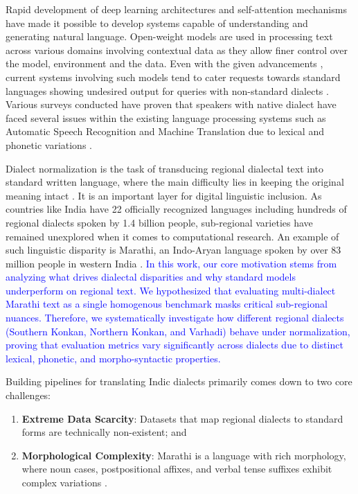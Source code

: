 Rapid development of deep learning architectures and self-attention mechanisms \cite{vaswani2017attention} have made it possible to develop systems capable of understanding and generating natural language. 
Open-weight models are used in processing text across various domains involving contextual data as they allow finer control over the model, environment and the data\cite{dubey2024llama3,gemma2024}.
Even with the given advancements , current systems involving such models tend to cater requests towards standard languages showing undesired output for queries with non-standard dialects \cite{joshi2020state}.
Various surveys conducted  \cite{blaschke2024what,joshi2025survey} have proven that speakers with native dialect have faced several issues within the existing language processing systems such as Automatic Speech Recognition and Machine Translation due to lexical and phonetic variations \cite{koenecke2020racial,kuparinen2023dialect}.

Dialect normalization is the task of transducing regional dialectal text into standard written language, where the main difficulty lies in keeping the original meaning intact \cite{kuparinen2023dialect}.
It is an important layer for digital linguistic inclusion. As countries like India have 22 officially recognized languages including hundreds of regional dialects spoken by 1.4 billion people, sub-regional varieties have remained unexplored when it comes to computational research. An example of such linguistic disparity is Marathi, an Indo-Aryan language spoken by over 83 million people in western India \cite{dabre2022indicbart}.
\textcolor{blue}{In this work, our core motivation stems from analyzing what drives dialectal disparities and why standard models underperform on regional text. We hypothesized that evaluating multi-dialect Marathi text as a single homogenous benchmark masks critical sub-regional nuances. Therefore, we systematically investigate how different regional dialects (Southern Konkan, Northern Konkan, and Varhadi) behave under normalization, proving that evaluation metrics vary significantly across dialects due to distinct lexical, phonetic, and morpho-syntactic properties.}

Building pipelines for translating Indic dialects primarily comes down to two core challenges:
\begin{enumerate}
    \item \textbf{Extreme Data Scarcity}: Datasets that map regional dialects to standard forms are technically non-existent; and
    \item \textbf{Morphological Complexity}: Marathi is a language with rich morphology, where noun cases, postpositional affixes, and verbal tense suffixes exhibit complex variations \cite{ansary2024unicode,partanen2019dialect}.
\end{enumerate}


